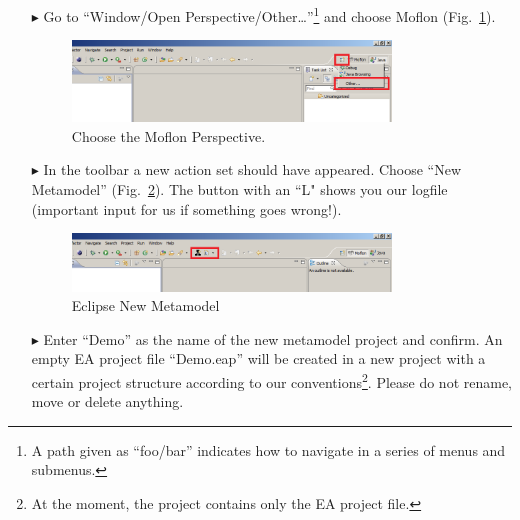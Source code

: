 \begin{enumerate}
\item[$\blacktriangleright$] Go to ``Window/Open
Perspective/Other\ldots''\footnote{A path given as ``foo/bar'' indicates how to
navigate in a series of menus and submenus.} and choose Moflon
(Fig.~\ref{fig_eclipse}). \begin{figure}[!h]
	\centering
  \includegraphics[width=0.8\textwidth]{pics/eclipse_firststart.png}
	\caption{Choose the Moflon Perspective.}
	\label{fig_eclipse}
\end{figure}

\item[$\blacktriangleright$] In the toolbar a new action set should have
appeared. Choose ``New Metamodel'' (Fig.~\ref{fig_eclipseNewMetamodel}).
The button with an ``L" shows you our logfile (important input for us if
something goes wrong!).
\begin{figure}[!h]
	\centering
  \includegraphics[width=0.8\textwidth]{pics/installationAndSetup/eclipse_metamodelButton.png}
	\caption{Eclipse New Metamodel}
	\label{fig_eclipseNewMetamodel}
\end{figure}

\item[$\blacktriangleright$] Enter ``Demo'' as the name of the new metamodel
project and confirm. 
An empty EA project file ``Demo.eap'' will be
created in a new project with a certain project structure
according to our conventions\footnote{At the moment, the project contains only the EA project file.}.
Please do not rename, move or delete anything.

\newpage


\end{enumerate}
